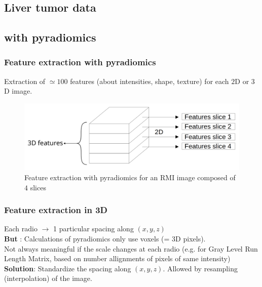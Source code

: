 \documentclass{beamer}
\begin{document}
\begin{frame}
    \section{Liver tumor data}
    \subsection{with pyradiomics}
\end{frame}

\begin{frame}
    \frametitle{Feature extraction with pyradiomics \cite{pyradio}}
    Extraction of $\simeq  100$ features (about intensities, shape, texture) for each $2$D or $3$D image.\\[10 pt]
    \begin{figure}
        \centering
        \includegraphics[scale = 0.15]{images/features.png}
        \caption{Feature extraction with pyradiomics for an RMI image composed of $4$ slices}
    \end{figure}
\end{frame}

\begin{frame}
    \frametitle{Feature extraction in 3D}
    Each radio $\rightarrow$ 1 particular spacing along $(x,y,z)$\\[10 pt]
    \textbf{But} : Calculations of pyradiomics only use voxels (= 3D pixels).\\[10 pt]
    Not always meaningful if the scale changes at each radio (e.g. for Gray Level Run Length Matrix, based on number allignments of pixels of same intensity)\\[10 pt]
    \textbf{Solution}: Standardize the spacing along $(x,y,z)$. Allowed by resampling (interpolation) of the image.
\end{frame}
\end{document}
